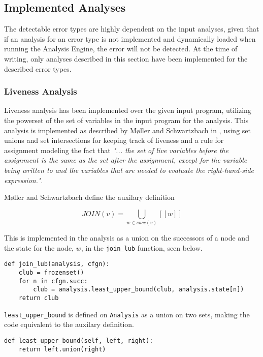 \subsection{Implemented Analyses}

The detectable error types are highly dependent on the input analyses, given that if an analysis for an error type is not implemented and dynamically loaded when running the Analysis Engine, the error will not be detected. At the time of writing, only analyses described in this section have been implemented for the described error types. 

\subsubsection{Liveness Analysis}
Liveness analysis has been implemented over the given input program, utilizing the powerset of the set of variables in the input program for the analysis. 
This analysis is implemented as described by Møller and Schwartzbach in \cite{spa}, using set unions and set intersections for keeping track of liveness and a rule for assignment modeling the fact that \textit{"... the set of live variables before the assignment is the same as the set after the assignment, except for the variable being written to and the variables that are needed to evaluate the right-hand-side expression."}. 

\newpar Møller and Schwartzbach define the auxilary definition

\begin{equation*}
    J O I N (v) = \mathop{{\bigcup}}_{w \in succ(v)} [[w]]
\end{equation*}

\noindent This is implemented in the analysis as a union on the successors of a node and the state for the node, $w$, in the \texttt{join\_lub} function, seen below. 

\begin{verbatim}
def join_lub(analysis, cfgn):
    club = frozenset()
    for n in cfgn.succ:
        club = analysis.least_upper_bound(club, analysis.state[n])
    return club
\end{verbatim}

\noindent \texttt{least\_upper\_bound} is defined on \texttt{Analysis} as a union on two sets, making the code equivalent to the auxilary definition. 

\begin{verbatim}
def least_upper_bound(self, left, right):
    return left.union(right)
\end{verbatim}

